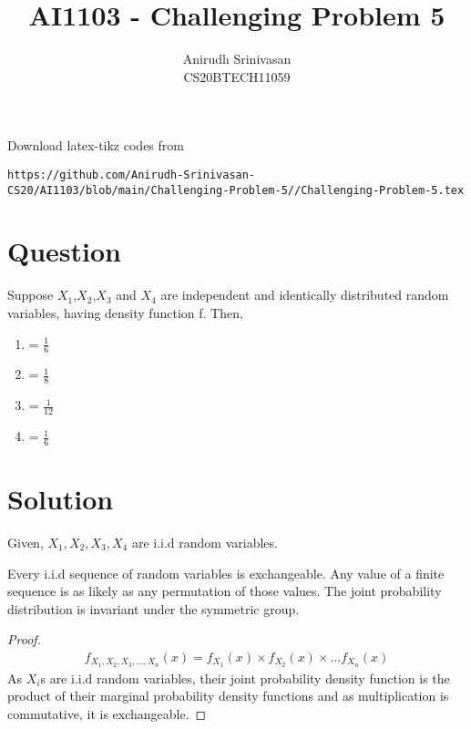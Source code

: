 \documentclass[journal,12pt,twocolumn]{IEEEtran}
\begin{document}
\let\vec\mathbf
\renewcommand{\thefigure}{\theproblem}
\def\putbox#1#2#3{\makebox[0in][l]{\makebox[#1][l]{}\raisebox{\baselineskip}[0in][0in]{\raisebox{#2}[0in][0in]{#3}}}}
     \def\rightbox#1{\makebox[0in][r]{#1}}
     \def\centbox#1{\makebox[0in]{#1}}
     \def\topbox#1{\raisebox{-\baselineskip}[0in][0in]{#1}}
     \def\midbox#1{\raisebox{-0.5\baselineskip}[0in][0in]{#1}}
\vspace{3cm}
\title{AI1103 - Challenging Problem 5}
\author{Anirudh Srinivasan\\CS20BTECH11059}
\maketitle
\newpage
\bigskip
\renewcommand{\thefigure}{\theenumi}
\renewcommand{\thetable}{\theenumi}
Download latex-tikz codes from 
%
\begin{lstlisting}
https://github.com/Anirudh-Srinivasan-CS20/AI1103/blob/main/Challenging-Problem-5//Challenging-Problem-5.tex
\end{lstlisting}
\section*{Question}
Suppose $X_1$,$X_2$,$X_3$ and $X_4$ are independent and identically distributed random variables, having density function f. Then,
\begin{enumerate}[label=\Alph*)]
\item {} = $\frac{1}{6}$
\item {} = $\frac{1}{8}$
\item {} = $\frac{1}{12}$
\item {} = $\frac{1}{6}$
\end{enumerate}

\section*{Solution}
Given, $X_1,X_2,X_3,X_4$ are i.i.d random variables.
\begin{lemma}
Every i.i.d sequence of random variables is exchangeable. 
Any value of a finite sequence is as likely as any permutation of those values. The joint probability distribution is invariant under the symmetric group.
\end{lemma}

\begin{proof}
\begin{align}
    f_{X_1,X_2,X_3,\dots,X_n}(x) = f_{X_1}(x) \times f_{X_2}(x) \times \dots f_{X_n}(x) 
\end{align}
As $X_i$s are i.i.d random variables, their joint probability density function is the product of their marginal probability density functions and as multiplication is commutative, it is exchangeable.
    
\end{proof}
\end{document}
